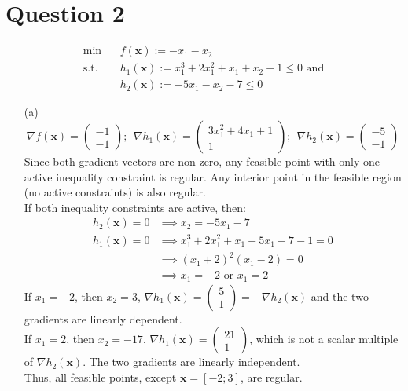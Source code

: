 \documentclass{article}
\begin{document}
\section*{Question 2}
\begin{align*}
    \min \ \ \ \ & f(\mathbf{x}) := -x_1-x_2\\
    \text{s.t. } \ \ \ & h_1(\mathbf{x}) := x_1^3+2x_1^2+x_1+x_2-1\leq 0 \text{ and}\\
    & h_2(\mathbf{x}) := -5x_1-x_2-7\leq 0
\end{align*}
\begin{itemize}
    \item[(a)] \[
    \nabla f(\mathbf{x}) = \begin{pmatrix}-1\\-1\end{pmatrix};\ \ \nabla h_1(\mathbf{x}) = \begin{pmatrix}3x_1^2+4x_1+1\\1\end{pmatrix};\ \ \nabla h_2(\mathbf{x}) = \begin{pmatrix}-5\\-1\end{pmatrix}\]
Since both gradient vectors are non-zero, any feasible point with only one active inequality constraint is regular. Any interior point in the feasible region (no active constraints) is also regular.\\
If both inequality constraints are active, then: \begin{align*}
    h_2(\mathbf{x}) = 0 &\implies x_2 = -5x_1-7\\
    h_1(\mathbf{x}) = 0 &\implies x_1^3 + 2x_1^2 + x_1 -5x_1-7-1 = 0\\
    &\implies (x_1+2)^2(x_1-2)=0\\
    &\implies x_1 = -2 \text{ or } x_1= 2
\end{align*}
If $x_1 = -2$, then $x_2 =3 $, $\nabla h_1(\mathbf{x}) = \begin{pmatrix}5\\1\end{pmatrix} = -\nabla h_2(\mathbf{x})$ and the two gradients are linearly dependent. \\
If $x_1 = 2$, then $x_2 =-17 $, $\nabla h_1(\mathbf{x}) = \begin{pmatrix}21\\1\end{pmatrix}$, which is not a scalar multiple of $\nabla h_2(\mathbf{x})$. The two gradients are linearly independent. \\
Thus, all feasible points, except $\mathbf{x} = [-2;3]$, are regular.


\end{itemize}
\end{document}
